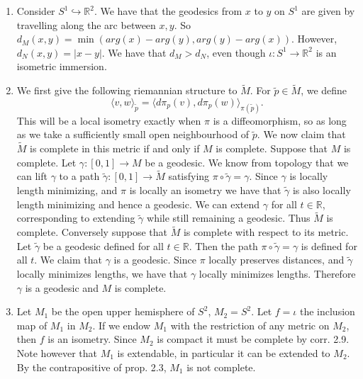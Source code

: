 \documentclass[12pt, a4paper]{article}
\theoremstyle{definition}
\newcommand{\penum}{ \begin{enumerate}[label=\bf(\alph*), leftmargin=0pt]}
\newcommand{\epenum}{ \end{enumerate} }
\newcommand{\R}{\mathbb{R}}                           %
\newcommand{\lan}{\langle}
\newcommand{\ran}{\rangle}
\newcommand{\inn}[1]{\lan#1\ran}
\begin{document}
\penum 
\item Consider $S^1 \hookrightarrow \R^2$. We have that the geodesics from $x$ to $y$ on $S^1$ are given by travelling along the arc between $x,y$. So $d_M(x,y) = \min(arg(x) - arg(y), arg(y) - arg(x) ).$ However, $d_N(x,y) = |x-y|$. We have that $d_M> d_N$, even though $\iota: S^1 \to \R^2$ is an isometric immersion. 
\item We first give the following riemannian structure to $\widetilde{M}$. For $\tilde{p} \in \widetilde{M}$, we define 
$$\inn{v,w}_{\tilde{p}} = \inn{d\pi_p(v) , d\pi_p(w)}_{\pi(\tilde{p})}.$$
This will be a local isometry exactly when $\pi$ is a diffeomorphism, so as long as we take a sufficiently small open neighbourhood of $\tilde{p}$. 
We now claim that $\widetilde{M}$ is complete in this metric if and only if $M$ is complete.
Suppose that $M$ is complete. Let $\gamma:[0,1] \to M$ be a geodesic. 
We know from topology that we can lift $\gamma$ to a path $\tilde{\gamma}: [0,1] \to \widetilde{M}$ satisfying $\pi \circ \tilde{\gamma} = \gamma$. Since $\gamma$ is locally length minimizing, and $\pi$ is locally an isometry we have that $\tilde{\gamma}$ is also locally length minimizing and hence a geodesic. 
We can extend $\gamma$ for all $t\in \R$, corresponding to extending $\tilde{\gamma}$ while still remaining a geodesic. Thus $\widetilde{M}$ is complete. 
Conversely suppose that $\widetilde{M}$ is complete with respect to its metric. Let $\tilde{\gamma}$ be a geodesic defined for all $t\in \R$. Then the path $\pi \circ \tilde{\gamma} = \gamma$ is defined for all $t$. We claim that $\gamma$ is a geodesic. Since $\pi$ locally preserves distances, and $\tilde{\gamma}$ locally minimizes lengths, we have that $\gamma$ locally minimizes lengths. Therefore $\gamma$ is a geodesic and $M$ is complete. 
\item Let $M_1$ be the open upper hemisphere of $S^2$, $M_2 = S^2$. Let $f = \iota$ the inclusion map of $M_1$ in $M_2$. If we endow $M_1$ with the restriction of any metric on $M_2$, then $f$ is an isometry. Since $M_2$ is compact it must be complete by corr. 2.9. Note however that $M_1$ is extendable, in particular it can be extended to $M_2$. By the contrapositive of prop. 2.3, $M_1$ is not complete.
\epenum
\newpage 
\end{document}
